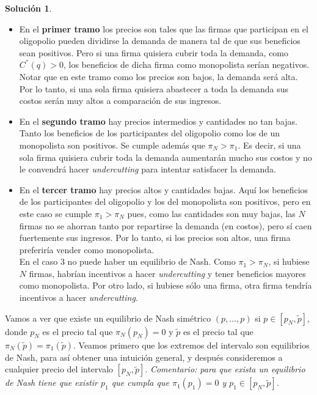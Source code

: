 \documentclass[a4paper, 11pt]{article}
\theoremstyle{definition}
\newtheorem{solucion}{Soluci\'on}
\begin{document}
\begin{solucion}
\begin{center}
\end{center}
\vspace*{-12pt}
\begin{itemize}
    \item En el \textbf{primer tramo} los precios son tales que las firmas que participan en el oligopolio pueden dividirse la demanda de manera tal de que sus beneficios sean positivos. Pero si una firma quisiera cubrir toda la demanda, como $C^{''}(q)>0$, los beneficios de dicha firma como monopolista serían negativos. Notar que en este tramo como los precios son bajos, la demanda será alta. Por lo tanto, si una sola firma quisiera abastecer a toda la demanda sus costos serán muy altos a comparación de sus ingresos.
    \item En el \textbf{segundo tramo} hay precios intermedios y cantidades no tan bajas. Tanto los beneficios de los participantes del oligopolio como los de un monopolista son positivos. Se cumple además que $\pi_N>\pi_1$. Es decir, si una sola firma quisiera cubrir toda la demanda aumentarán mucho sus costos y no le convendrá hacer \textit{undercutting} para intentar satisfacer la demanda.
    \item En el \textbf{tercer tramo} hay precios altos y cantidades bajas. Aquí los beneficios de los participantes del oligopolio y los del monopolista son positivos, pero en este caso se cumple $\pi_1>\pi_N$ pues, como las cantidades son muy bajas, las $N$ firmas no se ahorran tanto por repartirse la demanda (en costos), pero sí caen fuertemente sus ingresos. Por lo tanto, si los precios son altos, una firma preferiría vender como monopolista. \\
En el caso 3 no puede haber un equilibrio de Nash. Como $\pi_1>\pi_N$, si hubiese $N$ firmas, habrían incentivos a hacer \textit{undercutting} y tener beneficios mayores como monopolista. Por otro lado, si hubiese sólo una firma, otra firma tendría incentivos a hacer \textit{undercutting}.
\end{itemize}

Vamos a ver que existe un equilibrio de Nash simétrico $(p,\dotsc , p)$  si $p \in [p_N,\widetilde{p}]$, donde $p_N$ es el precio tal que $\pi_N(p_N)=0$ y $\widetilde{p}$ es el precio tal que $\pi_N(\widetilde{p})=\pi_1(\widetilde{p})$. Veamos primero que los extremos del intervalo son equilibrios de Nash, para así obtener una intuición general, y después consideremos a cualquier precio del intervalo $[p_N,\widetilde{p}]$. \textit{Comentario: para que exista un equilibrio de Nash tiene que existir $p_1$ que cumpla que $\pi_1(p_1)=0$ y $p_1\in[p_N,\widetilde{p}]$.}



\end{solucion}
\end{document}
